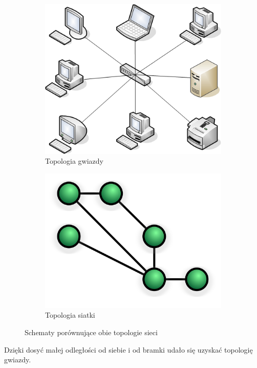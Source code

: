 \begin{figure}[H]

\centering
\begin{subfigure}{0.4\textwidth}
    \centering
    \includegraphics[width=0.8\linewidth]{zdj/star-top.png}
    \caption{Topologia gwiazdy \cite{fig-star-top}}
\end{subfigure}
\begin{subfigure}{0.4\textwidth}
    \centering
    \includegraphics[width=0.8\linewidth]{zdj/mesh-top.png}
    \caption{Topologia siatki \cite{fig-mesh-top}}
\end{subfigure}
   
\caption{Schematy porównujące obie topologie sieci}
\label{topologies}

\end{figure}

Dzięki dosyć małej odległości od siebie i od bramki udało się uzyskać topologię gwiazdy.

